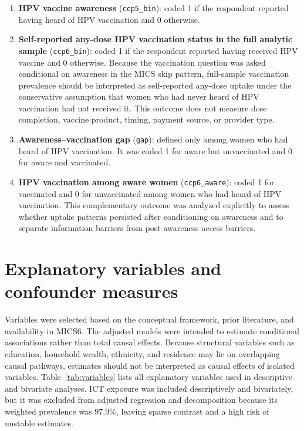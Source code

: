 \begin{enumerate}
    \item \textbf{HPV vaccine awareness} (\texttt{ccp5\_bin}): coded 1 if the respondent reported having heard of HPV vaccination and 0 otherwise.
    \item \textbf{Self-reported any-dose HPV vaccination status in the full analytic sample} (\texttt{ccp6\_bin}): coded 1 if the respondent reported having received HPV vaccine and 0 otherwise. Because the vaccination question was asked conditional on awareness in the MICS skip pattern, full-sample vaccination prevalence should be interpreted as self-reported any-dose uptake under the conservative assumption that women who had never heard of HPV vaccination had not received it. This outcome does not measure dose completion, vaccine product, timing, payment source, or provider type.
    \item \textbf{Awareness--vaccination gap} (\texttt{gap}): defined only among women who had heard of HPV vaccination. It was coded 1 for aware but unvaccinated and 0 for aware and vaccinated.
    \item \textbf{HPV vaccination among aware women} (\texttt{ccp6\_aware}): coded 1 for vaccinated and 0 for unvaccinated among women who had heard of HPV vaccination. This complementary outcome was analyzed explicitly to assess whether uptake patterns persisted after conditioning on awareness and to separate information barriers from post-awareness access barriers.
\end{enumerate}

\section{Explanatory variables and confounder measures}

Variables were selected based on the conceptual framework, prior literature, and availability in MICS6. The adjusted models were intended to estimate conditional associations rather than total causal effects. Because structural variables such as education, household wealth, ethnicity, and residence may lie on overlapping causal pathways, estimates should not be interpreted as causal effects of isolated variables. Table~\ref{tab:variables} lists all explanatory variables used in descriptive and bivariate analyses. ICT exposure was included descriptively and bivariately, but it was excluded from adjusted regression and decomposition because its weighted prevalence was 97.9\%, leaving sparse contrast and a high risk of unstable estimates.

